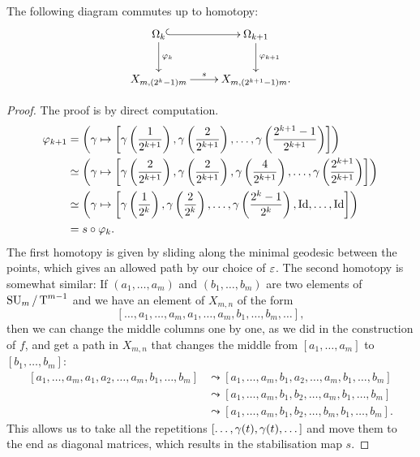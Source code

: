 \begin{lemma}
  \label{lem:com}
  The following diagram commutes up to homotopy:
  \[ \xymatrix{\Omega_k \ar@{^(->}[r] \ar[d]^{\varphi_k} & \Omega_{k+1}
  \ar[d]^{\varphi_{k+1}} \\
  X_{m,(2^k-1)m} \ar[r]^-{s} & X_{m,(2^{k+1}-1)m}. } \]
\end{lemma}
\begin{proof}
  The proof is by direct computation.
  \begin{align*}
    \varphi_{k+1} &= \left( \gamma \mapsto \left[
        \gamma\left(\frac{1}{2^{k+1}}\right),
        \gamma\left(\frac{2}{2^{k+1}}\right), \dots,
        \gamma\left(\frac{2^{k+1}-1}{2^{k+1}}\right) \right]\right) \\
    &\simeq \left(\gamma \mapsto \left[ \gamma\left(\frac{2}{2^{k+1}}\right),
      \gamma\left(\frac{2}{2^{k+1}}\right),
      \gamma\left(\frac{4}{2^{k+1}}\right), \dots,
      \gamma\left(\frac{2^{k+1}}{2^{k+1}}\right) \right]\right) \\
    &\simeq \left(\gamma\mapsto \left[ \gamma\left(\frac{1}{2^{k}}\right),
      \gamma\left(\frac{2}{2^{k}}\right), \dots,
      \gamma\left(\frac{2^k-1}{2^k}\right), \operatorname{Id},\dots,\operatorname{Id} \right] \right)\\
    &= s\circ \varphi_k.
  \end{align*}
  The first homotopy is given by sliding along the minimal geodesic
  between the points, which gives an allowed path by our choice of
  $\varepsilon$. The second homotopy is somewhat similar: If $(a_1,\dots,a_m)$
  and $(b_1,\dots,b_m)$ are two elements of $\operatorname{SU}_{m}/\operatorname{T}^{m-1}$ and we have an
  element of $X_{m,n}$ of the form
  \[ \left[ \dots, a_1,\dots,a_m,a_1,\dots,a_m,b_1,\dots,b_m,\dots
  \right], \]
  then we can change the middle columns one by one, as we did in
  the construction of $f$, and get a path in $X_{m,n}$ that changes
  the middle from $[a_1,\dots,a_m]$ to $[b_1,\dots,b_m]$:
  \begin{align*}
    \left[a_1,\dots,a_m,a_1,a_2,\dots,a_m,b_1,\dots,b_m \right] 
    &\leadsto
    \left[a_1,\dots,a_m,b_1,a_2,\dots,a_m,b_1,\dots,b_m\right] \\ 
    &\leadsto
    \left[a_1,\dots,a_m,b_1,b_2,\dots,a_m,b_1,\dots,b_m\right] \\  
    &\leadsto
    \left[a_1,\dots,a_m,b_1,b_2,\dots,b_m,b_1,\dots,b_m\right].  
  \end{align*}
  This allows us to take all the repetitions
  $\left[\dots,\gamma(t),\gamma(t),\dots\right]$ and move them to the end as
  diagonal matrices, which results in the stabilisation map $s$.
\end{proof}

